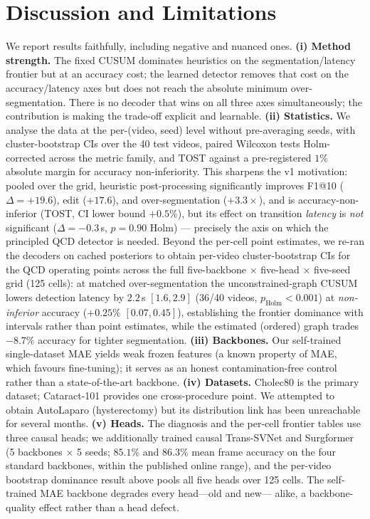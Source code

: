 \documentclass[11pt]{article}
\begin{document}
\section{Discussion and Limitations}
We report results faithfully, including negative and nuanced ones.
\textbf{(i) Method strength.} The fixed CUSUM dominates heuristics on the
segmentation/latency frontier but at an accuracy cost; the learned detector removes
that cost on the accuracy/latency axes but does not reach the absolute minimum
over-segmentation. There is no decoder that wins on all three axes simultaneously;
the contribution is making the trade-off explicit and learnable.
\textbf{(ii) Statistics.} We analyse the data at the per-(video, seed) level without
pre-averaging seeds, with cluster-bootstrap CIs over the 40 test videos, paired
Wilcoxon tests Holm-corrected across the metric family, and TOST against a
pre-registered $1\%$ absolute margin for accuracy non-inferiority. This sharpens the
v1 motivation: pooled over the grid, heuristic post-processing significantly improves
F1@10 ($\Delta{=}{+}19.6$), edit ($+17.6$), and over-segmentation ($+3.3\times$), and
is accuracy-non-inferior (TOST, CI lower bound ${+}0.5\%$), but its effect on
transition \emph{latency} is \emph{not} significant ($\Delta{=}{-}0.3$\,s, $p{=}0.90$
Holm) --- precisely the axis on which the principled QCD detector is needed. Beyond the
per-cell point estimates, we re-ran the decoders on cached posteriors to obtain per-video
cluster-bootstrap CIs for the QCD operating points across the full five-backbone $\times$
five-head $\times$ five-seed grid (125 cells): at matched over-segmentation the
unconstrained-graph CUSUM lowers detection latency by $2.2$\,s $[1.6,2.9]$ (36/40 videos,
$p_{\text{Holm}}<0.001$) at \emph{non-inferior} accuracy ($+0.25\%$ $[0.07,0.45]$),
establishing the frontier dominance with intervals rather than point estimates, while the
estimated (ordered) graph trades $-8.7\%$ accuracy for tighter segmentation.
\textbf{(iii) Backbones.} Our self-trained single-dataset MAE yields weak frozen
features (a known property of MAE, which favours fine-tuning); it serves as an
honest contamination-free control rather than a state-of-the-art backbone.
\textbf{(iv) Datasets.} Cholec80 is the primary dataset; Cataract-101 provides one
cross-procedure point. We attempted to obtain AutoLaparo (hysterectomy) but its
distribution link has been unreachable for several months.
\textbf{(v) Heads.} The diagnosis and the per-cell frontier tables use three causal heads;
we additionally trained causal Trans-SVNet and Surgformer (5 backbones $\times$ 5 seeds;
$85.1\%$ and $86.3\%$ mean frame accuracy on the four standard backbones, within the
published online range), and the per-video bootstrap dominance result above pools all five
heads over 125 cells. The self-trained MAE backbone degrades every head---old and new---
alike, a backbone-quality effect rather than a head defect.
\end{document}
